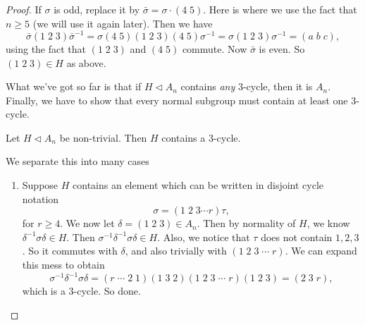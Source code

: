 \documentclass[a4paper]{article}
\begin{document}
\begin{proof}
  If $\sigma$ is odd, replace it by $\bar{\sigma} = \sigma \cdot (4\; 5)$. Here is where we use the fact that $n \geq 5$ (we will use it again later). Then we have
  \[
    \bar{\sigma} (1\; 2\; 3) \bar{\sigma}^{-1} = \sigma (4\; 5)(1\; 2\; 3)(4\; 5) \sigma^{-1} = \sigma(1\; 2\; 3) \sigma^{-1} = (a\; b\; c),
  \]
  using the fact that $(1\; 2\; 3)$ and $(4\; 5)$ commute. Now $\bar{\sigma}$ is even. So $(1\; 2\; 3) \in H$ as above.

  What we've got so far is that if $H \lhd A_n$ contains \emph{any} $3$-cycle, then it is $A_n$. Finally, we have to show that every normal subgroup must contain at least one $3$-cycle.
  \begin{claim}
    Let $H \lhd A_n$ be non-trivial. Then $H$ contains a $3$-cycle.
  \end{claim}
  We separate this into many cases
  \begin{enumerate}
    \item Suppose $H$ contains an element which can be written in disjoint cycle notation
      \[
        \sigma = (1\; 2\; 3 \cdots r) \tau,
      \]
      for $r \geq 4$. We now let $\delta = (1\; 2\; 3) \in A_n$. Then by normality of $H$, we know $\delta^{-1} \sigma \delta \in H$. Then $\sigma^{-1}\delta^{-1}\sigma \delta \in H$. Also, we notice that $\tau$ does not contain $1, 2, 3$. So it commutes with $\delta$, and also trivially with $(1\; 2\; 3\; \cdots\; r)$. We can expand this mess to obtain
      \[
        \sigma^{-1} \delta^{-1} \sigma\delta = (r\; \cdots \; 2\; 1)(1\; 3\; 2)(1\; 2\; 3\; \cdots \; r)(1\; 2\; 3) = (2\; 3 \; r),
      \]
      which is a $3$-cycle. So done.


\end{enumerate}
\end{proof}
\end{document}
